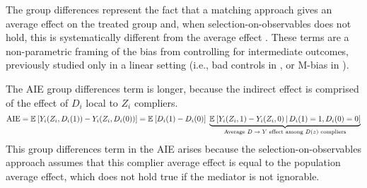 The group differences represent the fact that a matching approach gives an average effect on the treated group and, when selection-on-observables does not hold, this is systematically different from the average effect \citep{heckman1998characterizing}.
These terms are a non-parametric framing of the bias from controlling for intermediate outcomes, previously studied only in a linear setting (i.e., bad controls in \citealt{cinelli2024crash}, or M-bias in \citealt{ding2015adjust}).

The AIE group differences term is longer, because the indirect effect is comprised of the effect of $D_i$ local to $Z_i$ compliers.
\[ \text{AIE}
    = \mathbb{E}_{} \left[ Y_i(Z_i, D_i(1)) - Y_i(Z_i, D_i(0)) \right]
    = \mathbb{E}_{} \left[ D_i(1) - D_i(0) \right] \; 
        \underbrace{\mathbb{E}_{} \left[ Y_i(Z_i, 1) - Y_i(Z_i, 0) \, \middle\vert \, D_i(1)=1, D_i(0)=0 \right]}_{
            \text{Average $D \to Y$ effect among $D(z)$ compliers}
        } \]
This group differences term in the AIE arises because the selection-on-observables approach assumes that this complier average effect is equal to the population average effect, which does not hold true if the mediator is not ignorable.
%